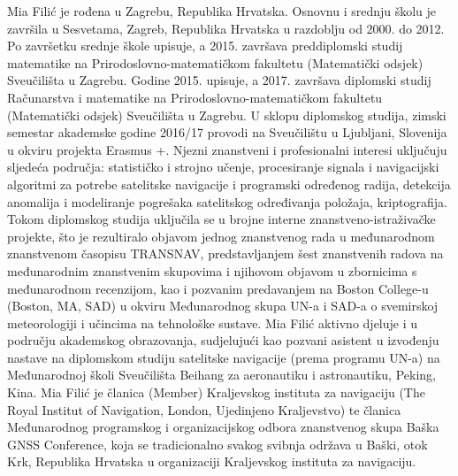 \documentclass[a4paper,twoside,12pt]{memoir} %
\begin{document}
\begin{cv}
Mia Filić je rođena u Zagrebu, Republika Hrvatska. Osnovnu i srednju školu je završila u
Sesvetama, Zagreb, Republika Hrvatska u razdoblju od 2000. do 2012. Po završetku srednje škole upisuje, a 2015. završava preddiplomski
studij matematike na Prirodoslovno-matematičkom fakultetu (Matematički odsjek) Sveučilišta u
Zagrebu. Godine 2015. upisuje, a 2017. završava diplomski studij Računarstva i matematike na
Prirodoslovno-matematičkom fakultetu (Matematički odsjek) Sveučilišta u Zagrebu. U sklopu diplomskog studija, zimski
semestar akademske godine 2016/17 provodi na Sveučilištu u Ljubljani, Slovenija u okviru
projekta Erasmus +.
Njezni znanstveni i profesionalni interesi uključuju sljedeća područja: statističko i strojno učenje,
procesiranje signala i navigacijski algoritmi za potrebe satelitske navigacije i programski određenog
radija, detekcija anomalija i modeliranje pogrešaka satelitskog određivanja položaja, kriptografija.
Tokom diplomskog studija uključila se u brojne interne znanstveno-istraživačke projekte, što je
rezultiralo objavom jednog znanstvenog rada u međunarodnom znanstvenom časopisu
TRANSNAV, predstavljanjem šest znanstvenih radova na međunarodnim znanstvenim skupovima i
njihovom objavom u zbornicima s međunarodnom recenzijom, kao i pozvanim predavanjem na
Boston College-u (Boston, MA, SAD) u okviru Međunarodnog skupa UN-a i SAD-a o svemirskoj
meteorologiji i učincima na tehnološke sustave. Mia Filić aktivno djeluje i u području akademskog
obrazovanja, sudjelujući kao pozvani asistent u izvođenju nastave na diplomskom studiju satelitske
navigacije (prema programu UN-a) na Međunarodnoj školi Sveučilišta Beihang za aeronautiku i
astronautiku, Peking, Kina.
Mia Filić je članica (Member) Kraljevskog instituta za navigaciju (The Royal Institut of Navigation,
London, Ujedinjeno Kraljevstvo) te članica Međunarodnog programskog i organizacijskog odbora
znanstvenog skupa Baška GNSS Conference, koja se tradicionalno svakog svibnja održava u Baški,
otok Krk, Republika Hrvatska u organizaciji Kraljevskog instituta za navigaciju.
\end{cv}

\appendix
\end{document}
